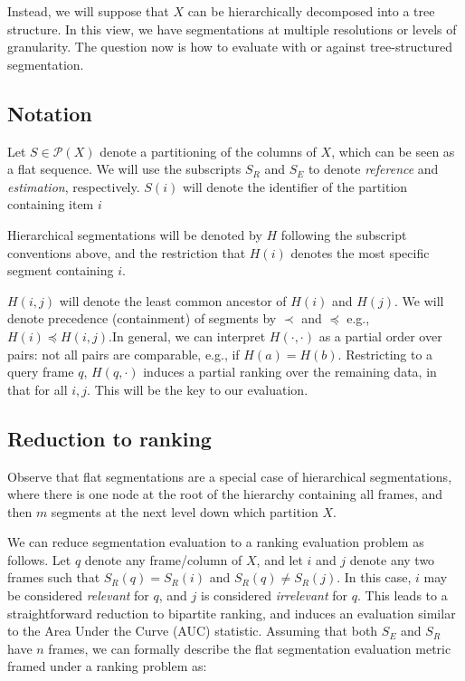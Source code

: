 \documentclass{article}
\begin{document}
Instead, we will suppose that $X$ can be hierarchically decomposed into a tree structure.
In this view, we have segmentations at multiple resolutions or levels of granularity.
The question now is how to evaluate with or against tree-structured segmentation.

\subsection{Notation}

Let $S \in \mathcal{P}(X)$ denote a partitioning of the columns of $X$, which can be seen as a flat sequence.
We will use the subscripts $S_R$ and $S_E$ to denote \emph{reference} and \emph{estimation}, respectively.
$S(i)$ will denote the identifier of the partition containing item $i$

Hierarchical segmentations will be denoted by $H$ following the subscript conventions above, and the restriction that $H(i)$ denotes the most specific segment containing $i$.

$H(i, j)$ will denote the least common ancestor of $H(i)$ and $H(j)$.
We will denote precedence (containment) of segments by $\prec$ and $\preceq$ e.g., $H(i) \preceq H(i, j)$.In general, we can interpret $H(\cdot, \cdot)$ as a partial order over pairs: not all pairs are comparable, e.g., if $H(a) = H(b)$.
Restricting to a query frame $q$, $H(q, \cdot)$ induces a partial ranking over the remaining data, in that for all $i, j$.
This will be the key to our evaluation.


\subsection{Reduction to ranking}

Observe that flat segmentations are a special case of hierarchical segmentations, where there is one node at the root of the hierarchy containing all frames, and then $m$ segments at the next level down which partition $X$.

We can reduce segmentation evaluation to a ranking evaluation problem as follows.
Let $q$ denote any frame/column of $X$, and let $i$ and $j$ denote any two frames such that $S_R(q) = S_R(i)$ and $S_R(q) \neq S_R(j)$.
In this case, $i$ may be considered \emph{relevant} for $q$, and $j$ is considered \emph{irrelevant} for $q$.
This leads to a straightforward reduction to bipartite ranking, and induces an evaluation similar to the Area Under the Curve (AUC) statistic. 
Assuming that both $S_E$ and $S_R$ have $n$ frames, we can formally describe the flat segmentation evaluation metric framed under a ranking problem as:
\end{document}
